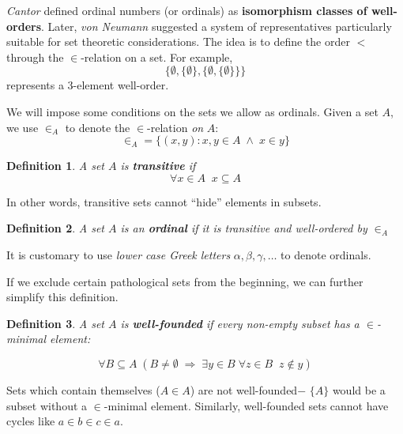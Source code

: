 \documentclass{article}
\newtheorem{definition}{Definition}[section]
\begin{document}
\textit{Cantor} defined ordinal numbers (or ordinals) as \textbf{isomorphism classes of well-orders}. Later, \textit{von Neumann} suggested a system of representatives particularly suitable for set theoretic considerations. The idea is to define the order $<$ through the $\in$-relation on a set. For example,
\begin{equation}

\{ \emptyset, \{\emptyset\}, \{\emptyset, \{\emptyset\}\}\}
\end{equation}
represents a 3-element well-order.

We will impose some conditions on the sets we allow as ordinals. Given a set $A$, we use $\in_A$ to denote the $\in$-relation \textit{on} $A$:
\begin{equation}

\in_A = \{ (x,y) \colon x,y \in A \; \wedge \; x \in y \}
\end{equation}

\begin{definition}\label{def-transitive}A set $A$ is \textbf{transitive} if
\begin{equation*}
\tag{trans}
    \forall x \in A \; \; x \subseteq A
\end{equation*}
\end{definition}In other words, transitive sets cannot ``hide'' elements in subsets.

\begin{definition}\label{def-ordinal}A set $A$ is an \textbf{ordinal} if it is transitive and well-ordered by $\in_A$

\end{definition}It is customary to use \textit{lower case Greek letters} $\alpha, \beta, \gamma, \dots$ to denote ordinals.

If we exclude certain pathological sets from the beginning, we can further simplify this definition.

\begin{definition}A set $A$ is \textbf{well-founded} if every non-empty subset has a $\in$-minimal element:

\begin{equation}
\forall B \subseteq A \; (B \ne \emptyset \; \Rightarrow \; \exists y \in B \;  \forall z \in B \; \; z \not \in y)
\end{equation}

\end{definition}Sets which contain themselves ($A \in A$) are not well-founded$-$ $\{A\}$ would be a subset without a $\in$-minimal element. Similarly, well-founded sets cannot have cycles like $a \in b \in c \in a$.
\end{document}
